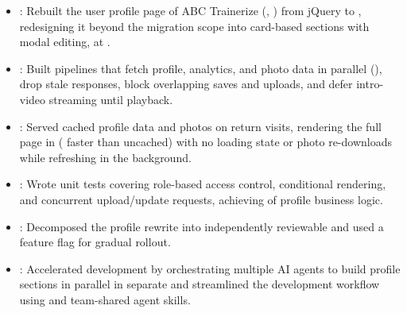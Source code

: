 \begin{itemize}
  \item {}: Rebuilt the user profile page of ABC Trainerize (, ) from jQuery to , redesigning it beyond the migration scope into card-based sections with modal editing, at .
  \item {}: Built  pipelines that fetch profile, analytics, and photo data in parallel (), drop stale responses, block overlapping saves and uploads, and defer intro-video streaming until playback.
  \item {}: Served cached profile data and photos on return visits, rendering the full page in  (\resumeEmphasis{2.4\ensuremath{\times}} faster than uncached) with no loading state or photo re-downloads while refreshing in the background.
  \item {}: Wrote  unit tests covering role-based access control, conditional rendering, and concurrent upload/update requests, achieving  of profile business logic.
  \item {}: Decomposed the profile rewrite into independently reviewable  and used a  feature flag for gradual rollout.
  \item {}: Accelerated development by orchestrating multiple AI agents to build profile sections in parallel in separate  and streamlined the development workflow using  and team-shared agent skills.
\end{itemize}
